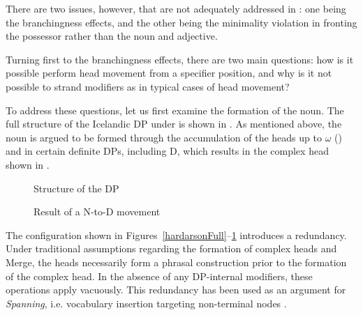 \documentclass[output=paper]{langscibook}
\begin{document}
There are two issues, however, that are not adequately addressed in \citet{Hardarson:2016wd}: one being the branchingness effects, and the other being the minimality violation in fronting the possessor rather than the noun and adjective.

Turning first to the branchingness effects, there are two main questions: how is it possible perform head movement from a specifier position, and why is it not possible to strand modifiers as in typical cases of head movement?

To address these questions, let us first examine the formation of the noun. The full structure of the Icelandic DP under \citet{Hardarson:2016wd} is shown in . As mentioned above, the noun is argued to be formed through the accumulation of the heads up to $\omega$ () and in certain definite DPs, including D, which results in the complex head shown in .

\begin{figure}
\captionsetup{margin=.05\linewidth}
\begin{floatrow}
	{\caption{Structure of the DP}\label{hardarsonFull}}
	{\caption{Result of a N-to-D movement}\label{hardarsonFullN}}
\end{floatrow}
\end{figure}

The configuration shown in Figures~\ref{hardarsonFull}--\ref{hardarsonFullN} introduces a redundancy. Under traditional assumptions regarding the formation of complex heads and Merge, the heads necessarily form a phrasal construction prior to the formation of the complex head. In the absence of any DP-internal modifiers, these operations apply vacuously. This redundancy has been used as an argument for \textit{Spanning}, i.e. vocabulary insertion targeting non-terminal nodes \citep[e.g.,][]{svenonius2016}.
\end{document}
